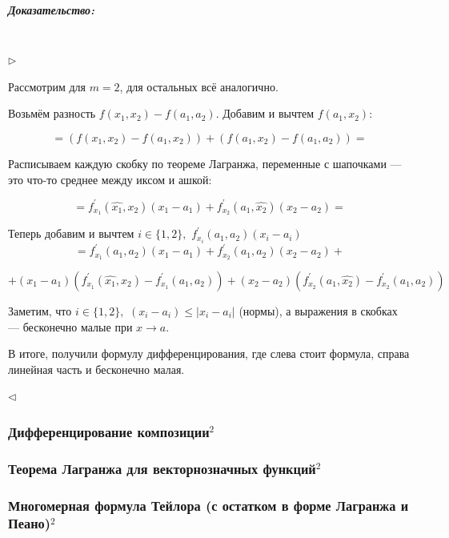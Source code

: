 \documentclass{article}
\def\dbl{\,\,}
\let\vanillasubparagraph\subparagraph
\renewcommand{\subparagraph}[1]{\vanillasubparagraph{#1}\mbox{}\\}
\begin{document}
\subparagraph{Доказательство: }

$\rhd$

Рассмотрим для $m = 2$, для остальных всё аналогично.

Возьмём разность $f(x_1, x_2) - f(a_1, a_2)$. Добавим и вычтем $f(a_1, x_2)$:

\[ = \left(f(x_1, x_2) - f(a_1, x_2)\right) + \left(f(a_1, x_2) - f(a_1, a_2)\right) = \]

Расписываем каждую скобку по теореме Лагранжа, переменные с шапочками --- это что-то среднее между иксом и ашкой:

\[ = f^\prime_{x_1}(\hat{x_1}, x_2)(x_1 - a_1) + f^\prime_{x_2}(a_1, \hat{x_2})(x_2 - a_2) = \]

Теперь добавим и вычтем $i \in \{1, 2\}, \dbl f^\prime_{x_i}(a_1, a_2)(x_i - a_i)$
\[ = f^\prime_{x_1}(a_1, a_2)(x_1 - a_1) + f^\prime_{x_2}(a_1, a_2)(x_2 - a_2) + \]

\[+ (x_1 - a_1)(f^\prime_{x_1}(\hat{x_1}, x_2) - f^\prime_{x_1}(a_1, a_2)) + (x_2 - a_2)(f^\prime_{x_2}(a_1, \hat{x_2}) - f^\prime_{x_2}(a_1, a_2))\]

Заметим, что $i \in \{1, 2\}, \dbl (x_i - a_i) \le |x_i - a_i|$ (нормы), а выражения в скобках --- бесконечно малые при $x \rightarrow a$.

В итоге, получили формулу дифференцирования, где слева стоит формула, справа линейная часть и бесконечно малая.

$\lhd$

\subsubsection{Дифференцирование композиции\texorpdfstring{$^2$}{}}



\subsubsection{Теорема Лагранжа для векторнозначных функций\texorpdfstring{$^2$}{}}



\subsubsection{Многомерная формула Тейлора (с остатком в форме Лагранжа и Пеано)\texorpdfstring{$^2$}{}}


\end{document}
